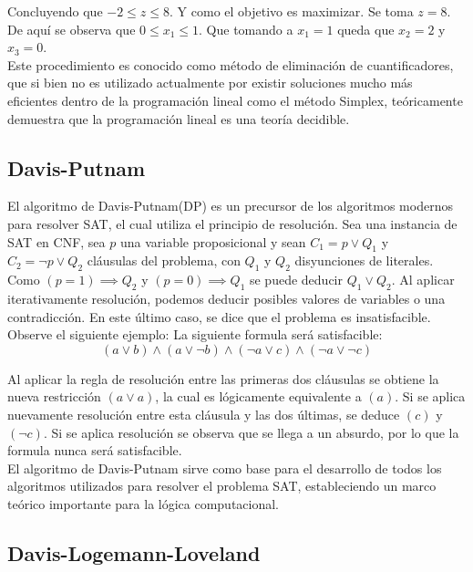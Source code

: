 \documentclass[12pt]{report}
\begin{document}
Concluyendo que $-2\leq  z \leq  8$. Y como el objetivo es maximizar. Se toma $z=8$. De aquí se observa que $0\leq  x_1 \leq 1$. Que tomando a $x_1=1$ queda que $x_2=2$ y $x_3 = 0$.\\

Este procedimiento es conocido como método de eliminación de cuantificadores, que si bien no es utilizado actualmente por existir soluciones mucho más eficientes dentro de la programación lineal como el método Simplex, teóricamente demuestra que la programación lineal es una teoría decidible.

\subsection{Davis-Putnam\\}

El algoritmo de Davis-Putnam(DP) es un precursor de los algoritmos modernos para resolver SAT, el cual utiliza el principio de resolución. Sea una instancia de SAT en CNF, sea $p$ una variable proposicional y sean $C_1=p \lor  Q_1$  y  $C_2 = \neg p \lor  Q_2$ cláusulas del problema, con $Q_1$ y $Q_2$ disyunciones de literales. Como $(p=1)\implies  Q_2$ y $(p=0)\implies  Q_1$ se puede deducir $Q_1\lor  Q_2$. Al aplicar iterativamente resolución, podemos deducir posibles valores de variables o una contradicción. En este último caso, se dice que el problema es insatisfacible.\\ 

Observe el siguiente ejemplo: La siguiente formula será satisfacible:
$$(a\lor  b) \land(a\lor  \neg b) \land (\neg a\lor  c) \land(\neg a\lor  \neg c)$$

Al aplicar la regla de resolución entre las primeras dos cláusulas se obtiene la nueva restricción $(a \lor  a)$, la cual es lógicamente equivalente a $(a)$. Si se aplica nuevamente resolución entre esta cláusula y las dos últimas, se deduce $(c)$ y $(\neg c)$. Si se aplica resolución se observa que se llega a un absurdo, por lo que la formula nunca será satisfacible. \\

El algoritmo de Davis-Putnam sirve como base para el desarrollo de todos los algoritmos utilizados para resolver el problema SAT, estableciendo un marco teórico importante para la lógica computacional.


\subsection{Davis-Logemann-Loveland\\}
\end{document}
